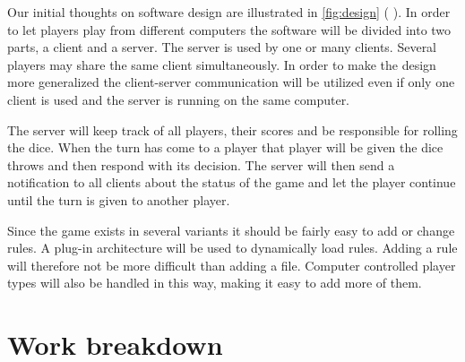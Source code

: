 \documentclass[10pt, titlepage, oneside, a4paper]{article}
\begin{document}
	Our initial thoughts on software design are illustrated in \figurename{} \ref{fig:design} (\pagename{} \pageref{fig:design}). In order to let players play from different computers the software will be divided into two parts, a client and a server. The server is used by one or many clients. Several players may share the same client simultaneously. In order to make the design more generalized the client-server communication will be utilized even if only one client is used and the server is running on the same computer.

	The server will keep track of all players, their scores and be responsible for rolling the dice. When the turn has come to a player that player will be given the dice throws and then respond with its decision. The server will then send a notification to all clients about the status of the game and let the player continue until the turn is given to another player.

	Since the game exists in several variants it should be fairly easy to add or change rules. A plug-in architecture will be used to dynamically load rules. Adding a rule will therefore not be more difficult than adding a file. Computer controlled player types will also be handled in this way, making it easy to add more of them.
	
	\section{Work breakdown}
	
\end{document}
